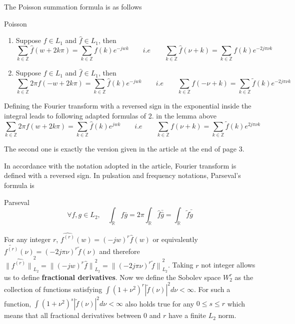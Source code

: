 \documentclass[a4paper, 11pt]{article}
\begin{document}
The Poisson summation formula is as follows
\begin{lem}{Poisson}
  \begin{enumerate}
    \item Suppose $f \in L_1$ and $\hat{f} \in L_1$, then
      \begin{equation*}
      \sum_{k \in \mathbb{Z}} \hat{f}(w+2k\pi) = \sum_{k \in \mathbb{Z}} f(k) e^{-jwk} \qquad i.e \qquad \sum_{k \in 
      \mathbb{Z}} \hat{f}(\nu+k) = \sum_{k \in \mathbb{Z}} f(k) e^{-2j\pi \nu k}
      \end{equation*}
    \item Suppose $f \in L_1$ and $\hat{f} \in L_1$, then
      \begin{equation*}
        \sum_{k \in \mathbb{Z}} 2\pi f(-w+2k\pi) = \sum_{k \in \mathbb{Z}} \hat{f}(k) e^{-jwk} \qquad i.e \qquad \sum_{k 
        \in \mathbb{Z}} f(-\nu+k) = \sum_{k \in \mathbb{Z}} \tilde{f}(k) e^{-2j\pi \nu k}
      \end{equation*}
  \end{enumerate}
\end{lem}

\begin{remark}{1} Defining the Fourier transform with a reversed sign in the exponential inside the integral leads to 
  following adapted formulas of 2\@. in the lemma above
  \begin{equation*}
    \sum_{k \in \mathbb{Z}} 2\pi f(w+2k\pi) = \sum_{k \in \mathbb{Z}} \hat{f}(k) e^{jwk} \qquad i.e \qquad \sum_{k \in 
    \mathbb{Z}} f(\nu+k) = \sum_{k \in \mathbb{Z}} \tilde{f}(k) e^{2j\pi \nu k}
  \end{equation*}

  The second one is exactly the version given in the article at the end of page 3.
\end{remark}

In accordance with the notation adopted in the article, Fourier transform is defined with a reversed sign. In pulsation 
and frequency notations, Parseval's formula is 

\begin{lem}{Parseval}
  \begin{equation*}
    \forall f, g \in L_2, \quad \int_{\mathbb{R}} f\bar{g} = 2\pi \int_{\mathbb{R}} \hat{f} \bar{\hat{g}} = 
    \int_{\mathbb{R}} \tilde{f} \bar{\tilde{g}}
  \end{equation*}
\end{lem}

For any integer $r$, $\hat{f^{(r)}}(w) = {(-jw)}^r \hat{f}(w)$ or equivalently $\tilde{f^{(r)}}(\nu) = {(-2j\pi \nu)}^r 
\tilde{f}(\nu)$ and therefore ${\|\hat{f^{(r)}}\|}_{L_2}^2 = {\|{(-jw)}^r\hat{f}\|}_{L_2}^2 = {\|{(-2j\pi 
\nu)}^r\tilde{f}\|}_{L_2}^2$. Taking $r$ not integer allows us to define \textbf{fractional derivatives}. Now we define 
the Sobolev space $W^r_2$ as the collection of functions satisfying $\int {(1+\nu^2)}^r |\tilde{f}(\nu)|^2 d\nu < 
\infty$. For such a function, $\int {(1+\nu^2)}^s |\tilde{f}(\nu)|^2 d\nu < \infty$ also holds true for any $0 \leq s 
\leq r$ which means that all fractional derivatives between 0 and $r$ have a finite $L_2$ norm. \\ 
\end{document}
